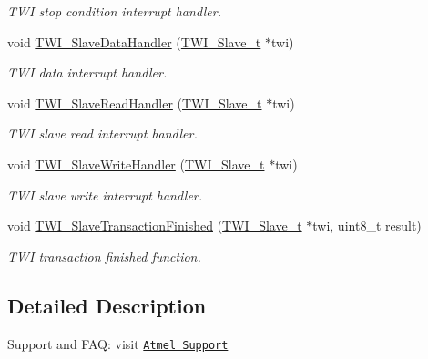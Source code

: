 \begin{DoxyCompactItemize}
\begin{DoxyCompactList}\small\item\em T\-W\-I stop condition interrupt handler. \end{DoxyCompactList}\item 
void \hyperlink{group__group__xmega__drivers__twi__twis_ga947368a10697462e8afadfe34a7a6274}{T\-W\-I\-\_\-\-Slave\-Data\-Handler} (\hyperlink{group__group__xmega__drivers__twi__twis_gabf4af194b6abde4d5fce8ded2aa33c18}{T\-W\-I\-\_\-\-Slave\-\_\-t} $\ast$twi)
\begin{DoxyCompactList}\small\item\em T\-W\-I data interrupt handler. \end{DoxyCompactList}\item 
void \hyperlink{group__group__xmega__drivers__twi__twis_gabb3eb0f58aa8d023748a66b952c34b51}{T\-W\-I\-\_\-\-Slave\-Read\-Handler} (\hyperlink{group__group__xmega__drivers__twi__twis_gabf4af194b6abde4d5fce8ded2aa33c18}{T\-W\-I\-\_\-\-Slave\-\_\-t} $\ast$twi)
\begin{DoxyCompactList}\small\item\em T\-W\-I slave read interrupt handler. \end{DoxyCompactList}\item 
void \hyperlink{group__group__xmega__drivers__twi__twis_ga1d1d99fa64ae60b098cf23f767c6212e}{T\-W\-I\-\_\-\-Slave\-Write\-Handler} (\hyperlink{group__group__xmega__drivers__twi__twis_gabf4af194b6abde4d5fce8ded2aa33c18}{T\-W\-I\-\_\-\-Slave\-\_\-t} $\ast$twi)
\begin{DoxyCompactList}\small\item\em T\-W\-I slave write interrupt handler. \end{DoxyCompactList}\item 
void \hyperlink{group__group__xmega__drivers__twi__twis_ga0486374e93f591d085238b105f804af9}{T\-W\-I\-\_\-\-Slave\-Transaction\-Finished} (\hyperlink{group__group__xmega__drivers__twi__twis_gabf4af194b6abde4d5fce8ded2aa33c18}{T\-W\-I\-\_\-\-Slave\-\_\-t} $\ast$twi, uint8\-\_\-t result)
\begin{DoxyCompactList}\small\item\em T\-W\-I transaction finished function. \end{DoxyCompactList}\end{DoxyCompactItemize}


\subsection{Detailed Description}
Support and F\-A\-Q\-: visit \href{http://www.atmel.com/design-support/}{\tt Atmel Support} 

